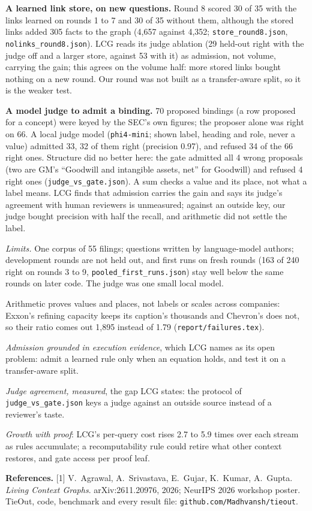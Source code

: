 \documentclass[10pt]{article}
\newcommand{\head}[1]{\vspace{5pt}{\normalsize\bfseries #1}\vspace{1pt}\par}
\newcommand{\sub}[1]{\textbf{#1}}
\newenvironment{tight}{\begin{list}{\textbullet}{\setlength{\leftmargin}{9pt}\setlength{\itemsep}{0.8pt}\setlength{\parsep}{0pt}\setlength{\topsep}{1pt}\setlength{\labelsep}{4pt}}}{\end{list}}
\newcommand{\rf}[1]{{\footnotesize\texttt{#1}}}
\begin{document}
\head{4. What did not transfer}
\sub{A learned link store, on new questions.} Round 8 scored 30 of 35 with the links learned on rounds 1 to 7 and 30 of 35 without them, although the stored links added 305 facts to the graph (4,657 against 4,352; \rf{store\_round8.json}, \rf{nolinks\_round8.json}). LCG reads its judge ablation (29 held-out right with the judge off and a larger store, against 53 with it) as admission, not volume, carrying the gain; this agrees on the volume half: more stored links bought nothing on a new round. Our round was not built as a transfer-aware split, so it is the weaker test.

\sub{A model judge to admit a binding.} 70 proposed bindings (a row proposed for a concept) were keyed by the SEC's own figures; the proposer alone was right on 66. A local judge model (\texttt{phi4-mini}; shown label, heading and role, never a value) admitted 33, 32 of them right (precision 0.97), and refused 34 of the 66 right ones. Structure did no better here: the gate admitted all 4 wrong proposals (two are GM's ``Goodwill and intangible assets, net'' for Goodwill) and refused 4 right ones (\rf{judge\_vs\_gate.json}). A sum checks a value and its place, not what a label means. LCG finds that admission carries the gain and says its judge's agreement with human reviewers is unmeasured; against an outside key, our judge bought precision with half the recall, and arithmetic did not settle the label.

\head{5. Limits, and what the internship could do next}
\begin{tight}
\item \emph{Limits.} One corpus of 55 filings; questions written by language-model authors; development rounds are not held out, and first runs on fresh rounds (163 of 240 right on rounds 3 to 9, \rf{pooled\_first\_runs.json}) stay well below the same rounds on later code. The judge was one small local model.
\item Arithmetic proves values and places, not labels or scales across companies: Exxon's refining capacity keeps its caption's thousands and Chevron's does not, so their ratio comes out 1,895 instead of 1.79 (\rf{report/failures.tex}).
\item \emph{Admission grounded in execution evidence}, which LCG names as its open problem: admit a learned rule only when an equation holds, and test it on a transfer-aware split.
\item \emph{Judge agreement, measured}, the gap LCG states: the protocol of \rf{judge\_vs\_gate.json} keys a judge against an outside source instead of a reviewer's taste.
\item \emph{Growth with proof}: LCG's per-query cost rises 2.7 to 5.9 times over each stream as rules accumulate; a recomputability rule could retire what other context restores, and gate access per proof leaf.
\end{tight}

\vspace{3pt}
{\footnotesize\textbf{References.} [1] V.~Agrawal, A.~Srivastava, E.~Gujar, K.~Kumar, A.~Gupta. \emph{Living Context Graphs}. arXiv:2611.20976, 2026; NeurIPS 2026 workshop poster. \quad [2] TieOut, code, benchmark and every result file: \texttt{github.com/Madhvansh/tieout}.}
\end{document}

